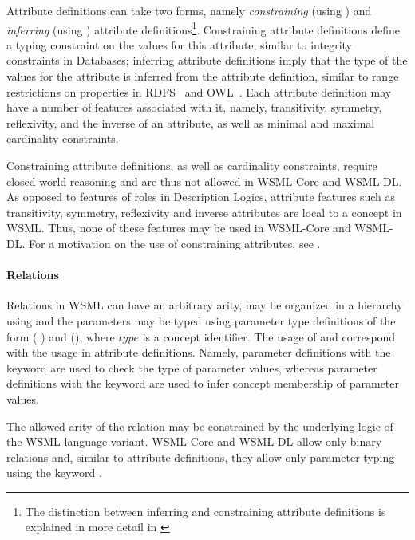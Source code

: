 Attribute definitions can take two forms, namely \emph{constraining}
(using ) and \emph{inferring} (using
) attribute definitions\footnote{The distinction
  between inferring and constraining attribute definitions is
  explained in more detail in \cite[Section
  2]{Bruijn+PolleresETAL-:05}}. Constraining attribute definitions
define a typing constraint on the values for this attribute, similar
to integrity constraints in Databases; inferring attribute
definitions imply that the type of the values for the attribute is
inferred from the attribute definition, similar to range
restrictions on properties in
RDFS~\cite{Brickley+Guha-VocaDescLang:03} and
OWL~\cite{Dean+Schreiber-OntoLangRefe:04}.  Each attribute
definition may have a number of features associated with it, namely,
transitivity, symmetry, reflexivity, and the inverse of an
attribute, as well as minimal and maximal cardinality constraints.

Constraining attribute definitions, as well as cardinality
constraints, require closed-world reasoning and are thus not allowed
in WSML-Core and WSML-DL. As opposed to features of roles in
Description Logics, attribute features such as transitivity,
symmetry, reflexivity and inverse attributes are local to a concept
in WSML. Thus, none of these features may be used in WSML-Core and
WSML-DL. For a motivation on the use of constraining attributes, see
\cite{Bruijn+PolleresETAL-:05}.

\paragraph{Relations}
Relations in WSML can have an arbitrary arity, may be organized in a
hierarchy using  and the parameters may be
typed using parameter type definitions of the form
( ) and (), where $type$ is a
concept identifier. The usage of  and
 correspond with the usage in attribute
definitions. Namely, parameter definitions with the 
keyword are used to check the type of parameter values, whereas
parameter definitions with the  keyword are used
to infer concept membership of parameter values.

The allowed arity of the relation may be constrained by the
underlying logic of the WSML language variant. WSML-Core and WSML-DL
allow only binary relations and, similar to attribute definitions,
they allow only parameter typing using the keyword
.


